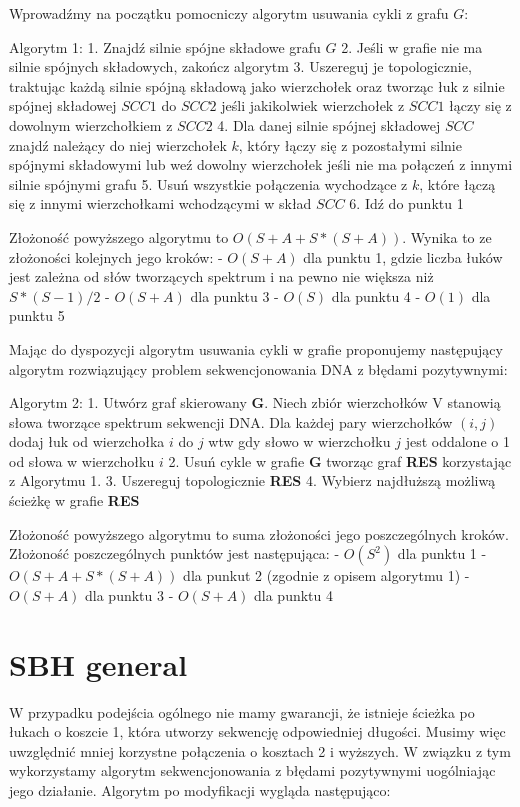 \documentclass[a4paper]{article}
\begin{document}
Wprowadźmy na początku pomocniczy algorytm usuwania cykli z grafu $G$:

Algorytm 1:
1. Znajdź silnie spójne składowe grafu $G$
2. Jeśli w grafie nie ma silnie spójnych składowych, zakończ algorytm
3. Uszereguj je topologicznie, traktując każdą silnie spójną składową jako wierzchołek oraz tworząc łuk z silnie spójnej składowej $SCC1$ do $SCC2$ jeśli jakikolwiek wierzchołek z $SCC1$ łączy się z dowolnym wierzchołkiem z $SCC2$
4. Dla danej silnie spójnej składowej $SCC$ znajdź należący do niej wierzchołek $k$, który łączy się z pozostałymi silnie spójnymi składowymi lub weź dowolny wierzchołek jeśli nie ma połączeń z innymi silnie spójnymi grafu
5. Usuń wszystkie połączenia wychodzące z $k$, które łączą się z innymi wierzchołkami wchodzącymi w skład $SCC$
6. Idź do punktu 1

Złożoność powyższego algorytmu to $O(S + A + S * (S + A))$. Wynika to ze złożoności kolejnych jego kroków:
- $O(S + A)$ dla punktu 1, gdzie liczba łuków jest zależna od słów tworzących spektrum i na pewno nie większa niż $S * (S-1) / 2$
- $O(S + A)$ dla punktu 3
- $O(S)$ dla punktu 4
- $O(1)$ dla punktu 5

Mając do dyspozycji algorytm usuwania cykli w grafie proponujemy następujący algorytm rozwiązujący problem sekwencjonowania DNA z błędami pozytywnymi:

Algorytm 2:
1. Utwórz graf skierowany {\bf G}. Niech zbiór wierzchołków V stanowią słowa tworzące spektrum sekwencji DNA. Dla każdej pary wierzchołków $(i,j)$ dodaj łuk od wierzchołka $i$ do $j$ wtw gdy słowo w wierzchołku $j$ jest oddalone o 1 od słowa w wierzchołku $i$
2. Usuń cykle w grafie {\bf G} tworząc graf {\bf RES} korzystając z Algorytmu 1.
3. Uszereguj topologicznie {\bf RES}
4. Wybierz najdłuższą możliwą ścieżkę w grafie {\bf RES}

Złożoność powyższego algorytmu to suma złożoności jego poszczególnych kroków. Złożoność poszczególnych punktów jest następująca:
- $O(S^2)$ dla punktu 1
- $O(S + A + S * (S + A))$ dla punkut 2 (zgodnie z opisem algorytmu 1)
- $O(S + A)$ dla punktu 3
- $O(S + A)$ dla punktu 4

\section{SBH general}
W przypadku podejścia ogólnego nie mamy gwarancji, że istnieje ścieżka po łukach o koszcie 1, która utworzy sekwencję odpowiedniej długości. Musimy więc uwzględnić mniej korzystne połączenia o kosztach 2 i wyższych. W związku z tym wykorzystamy algorytm sekwencjonowania z błędami pozytywnymi uogólniając jego działanie. Algorytm po modyfikacji wygląda następująco:
\end{document}
